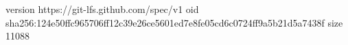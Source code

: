 version https://git-lfs.github.com/spec/v1
oid sha256:124e50ffc965706ff12c39e26ce5601ed7e8fe05cd6c0724ff9a5b21d5a7438f
size 11088
